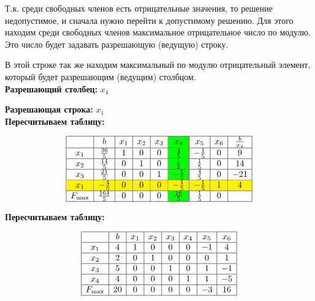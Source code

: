 \documentclass{article}
\begin{document}
Т.к. среди свободных членов есть отрицательные значения, то решение недопустимое, и сначала нужно перейти к допустимому решению. Для этого находим среди свободных членов максимальное отрицательное число по модулю. Это число будет задавать разрешающую (ведущую) строку.

В этой строке так же находим максимальный по модулю отрицательный элемент, который будет разрешающим (ведущим) столбцом.\\

\textbf{Разрешающий столбец:} \(x_4\)

\textbf{Разрешающая строка:} \(x_1\)\\


\textbf{Пересчитываем таблицу:}

\[
    \begin{array}{|c|c|c|c|c|>{\columncolor{green}}c|c|c|c|}
        \hline
                 & b             & x_1 & x_2 & x_3 & x_4          & x_5          & x_6 & \frac{b}{x_4} \\ \hline
        x_1      & \frac{36}{5}  & 1   & 0   & 0   & \frac{4}{5}  & -\frac{1}{5} & 0   & 9             \\ \hline
        x_2      & \frac{14}{5}  & 0   & 1   & 0   & \frac{1}{5}  & \frac{1}{5}  & 0   & 14            \\ \hline
        x_3      & \frac{21}{5}  & 0   & 0   & 1   & -\frac{1}{5} & \frac{4}{5}  & 0   & -21           \\ \hline
        \rowcolor{yellow}
        x_1      & -\frac{4}{5}  & 0   & 0   & 0   & -\frac{1}{5} & -\frac{1}{5} & 1   & 4             \\ \hline
        F_{\max} & \frac{164}{5} & 0   & 0   & 0   & \frac{16}{5} & \frac{1}{5}  & 0   &               \\ \hline
    \end{array}
\]

\textbf{Пересчитываем таблицу:}

\[
    \begin{array}{|c|c|c|c|c|c|c|c|}
        \hline
                 & b  & x_1 & x_2 & x_3 & x_4 & x_5 & x_6 \\ \hline
        x_1      & 4  & 1   & 0   & 0   & 0   & -1  & 4   \\ \hline
        x_2      & 2  & 0   & 1   & 0   & 0   & 0   & 1   \\ \hline
        x_3      & 5  & 0   & 0   & 1   & 0   & 1   & -1  \\ \hline
        x_4      & 4  & 0   & 0   & 0   & 1   & 1   & -5  \\ \hline
        F_{\max} & 20 & 0   & 0   & 0   & 0   & -3  & 16  \\ \hline
    \end{array}
\]
\end{document}
